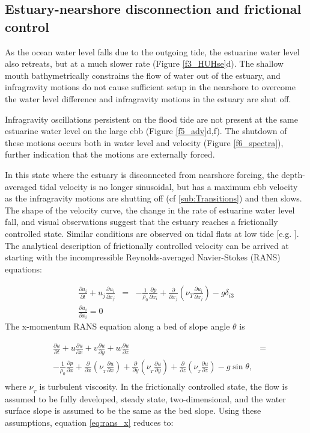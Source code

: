 \subsection{Estuary-nearshore disconnection and frictional control}

As the ocean water level falls due to the outgoing tide, the estuarine
water level also retreats, but at a much slower rate (Figure \ref{f3_HUHse}d).
The shallow mouth bathymetrically constrains the flow of water out
of the estuary, and infragravity motions do not cause sufficient setup
in the nearshore to overcome the water level difference and infragravity
motions in the estuary are shut off. 

Infragravity oscillations persistent on the flood tide are not present
at the same estuarine water level on the large ebb (Figure \ref{f5_adv}d,f).
The shutdown of these motions occurs both in water level and velocity
(Figure \ref{f6_spectra}), further indication that the motions are
externally forced.

In this state where the estuary is disconnected from nearshore forcing,
the depth-averaged tidal velocity is no longer sinusoidal, but has
a maximum ebb velocity as the infragravity motions are shutting off
(cf \ref{sub:Transitions}) and then slows. The shape of the velocity
curve, the change in the rate of estuarine water level fall, and visual
observations suggest that the estuary reaches a frictionally controlled
state. Similar conditions are observed on tidal flats at low tide
{[}e.g. \citealp{ralston_etal_2013}{]}. The analytical description
of frictionally controlled velocity can be arrived at starting with
the incompressible Reynolds-averaged Navier-Stokes (RANS) equations:

\begin{eqnarray}
\frac{\partial u_{i}}{\partial t}+u_{j}\frac{\partial u_{i}}{\partial x_{j}} & = & -\frac{1}{\rho_{0}}\frac{\partial p}{\partial x_{i}}+\frac{\partial}{\partial x_{j}}\left(\nu_{T}\frac{\partial u_{i}}{\partial x_{j}}\right)-g\delta_{i3}\nonumber \\
\frac{\partial u_{i}}{\partial x_{i}}=0
\end{eqnarray}
The x-momentum RANS equation along a bed of slope angle $\theta$
is 

\begin{eqnarray}
 & \frac{\partial u}{\partial t}+u\frac{\partial u}{\partial x}+v\frac{\partial u}{\partial y}+w\frac{\partial u}{\partial z} & =\nonumber \\
 & -\frac{1}{\rho_{0}}\frac{\partial p}{\partial x}+\frac{\partial}{\partial x}\left(\nu_{_{T}}\frac{\partial u}{\partial x}\right)+\frac{\partial}{\partial y}\left(\nu_{_{T}}\frac{\partial u}{\partial y}\right)+\frac{\partial}{\partial z}\left(\nu_{_{T}}\frac{\partial u}{\partial z}\right)-g\sin\theta,\label{eq:rans_x}\\
\nonumber 
\end{eqnarray}
where $\nu_{_{T}}$ is turbulent viscosity. In the frictionally controlled
state, the flow is assumed to be fully developed, steady state, two-dimensional,
and the water surface slope is assumed to be the same as the bed slope.
Using these assumptions, equation \ref{eq:rans_x} reduces to:

